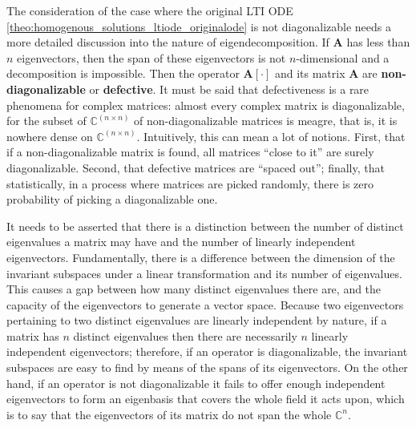 	The consideration of the case where the original LTI ODE \eqref{theo:homogenous_solutions_ltiode_originalode} is not diagonalizable needs a more detailed discussion into the nature of eigendecomposition. If $\mathbf{A}$ has less than $n$ eigenvectors, then the span of these eigenvectors is not $n$-dimensional and a decomposition is impossible. Then the operator $\mathbf{A}\left[\cdot\right]$ and its matrix $\mathbf{A}$ are \textbf{non-diagonalizable} or \textbf{defective}. It must be said that defectiveness is a rare phenomena for complex matrices: almost every complex matrix is diagonalizable, for the subset of $\mathbb{C}^{(n\times n)}$ of non-diagonalizable matrices is meagre, that is, it is nowhere dense on $\mathbb{C}^{(n\times n)}$. Intuitively, this can mean a lot of notions. First, that if a non-diagonalizable matrix is found, all matrices ``close to it'' are surely diagonalizable. Second, that defective matrices are ``spaced out''; finally, that statistically, in a process where matrices are picked randomly, there is zero probability of picking a diagonalizable one.

	It needs to be asserted that there is a distinction between the number of distinct eigenvalues a matrix may have and the number of linearly independent eigenvectors. Fundamentally, there is a difference between the dimension of the invariant subspaces under a linear transformation and its number of eigenvalues. This causes a gap between how many distinct eigenvalues there are, and the capacity of the eigenvectors to generate a vector space. Because two eigenvectors pertaining to two distinct eigenvalues are linearly independent by nature, if a matrix has $n$ distinct eigenvalues then there are necessarily $n$ linearly independent eigenvectors; therefore, if an operator is diagonalizable, the invariant subspaces are easy to find by means of the spans of its eigenvectors. On the other hand, if an operator is not diagonalizable it fails to offer enough independent eigenvectors to form an eigenbasis that covers the whole field it acts upon, which is to say that the eigenvectors of its matrix do not span the whole $\mathbb{C}^n$.

